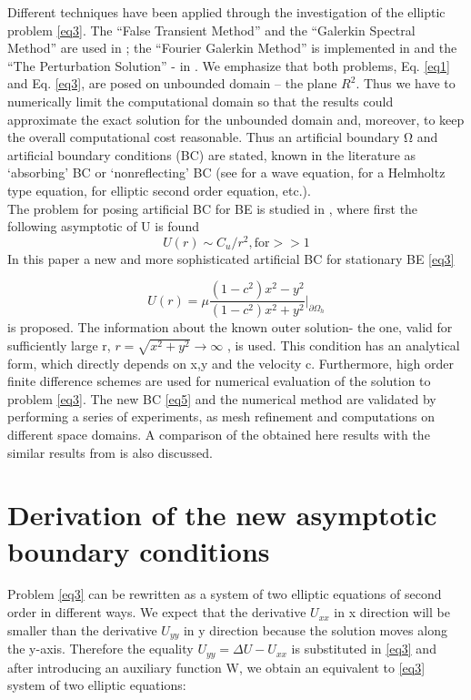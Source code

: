 \documentclass[12pt]{article}
\newcommand{\dO}{\partial\Omega_{h}}
\theoremstyle{theorem}
\theoremstyle{defi}
\begin{document}
Different techniques have been applied through the investigation of the elliptic problem \ref{eq3}. The “False Transient Method” and the “Galerkin Spectral Method” are used in \cite{ref6,ref9} ; the “Fourier Galerkin Method” is implemented in \cite{ref8,ref9} and the “The Perturbation Solution” - in \cite{ref10}.
We emphasize that both problems, Eq. \ref{eq1} and Eq. \ref{eq3}, are posed on unbounded domain – the plane $R^2$. Thus we have to numerically limit the computational domain so that the results could approximate the exact solution for the unbounded domain and, moreover, to keep the overall computational cost reasonable.
Thus an artificial boundary $Ω$ and artificial boundary conditions (BC) are stated, known in the literature as ‘absorbing’ BC or ‘nonreflecting’ BC (see \cite{ref11} for a wave equation, \cite{ref12} for a Helmholtz type equation, \cite{ref13} for elliptic second order equation, etc.). 
\\
The problem for posing artificial BC for BE is studied in \cite{ref6}, where first the following asymptotic of U is found
\begin{equation}
U(r) \sim  C_u/r^2, \text{for} >> 1\label{eq4}
\end{equation}
In this paper a new and more sophisticated artificial BC for stationary BE \ref{eq3}

\begin{equation}
U(r) =  \mu \frac{(1-c^2)x^2 - y^2}{(1-c^2)x^2 + y^2}|_{\dO}  \label{eq5}
\end{equation}
is proposed. The information about the known outer solution- the one, valid for sufficiently large r, $ r=\sqrt{x^2 + y^2}\rightarrow \infty$  , is used. This condition has an analytical form, which directly depends on x,y and the velocity c. Furthermore, high order finite difference schemes are used for numerical evaluation of the solution to problem \ref{eq3}. The new BC \ref{eq5} and the numerical method are validated by performing a series of experiments, as mesh refinement and computations on different space domains. A comparison of the obtained here results with the similar results from  \cite{ref10} is also discussed. 

\section{Derivation of the new asymptotic boundary conditions }

Problem \ref{eq3} can be rewritten as a system of two elliptic equations of second order in different ways. We expect that the derivative  $U_{xx}$ in x direction will be smaller than the derivative $U_{yy}$  in y direction because the solution moves along the y-axis. Therefore the equality $U_{yy} = \Delta U - U_{xx}$  is substituted in \ref{eq3} and after introducing an auxiliary function W, we obtain an equivalent to \ref{eq3} system of two elliptic equations:
\end{document}
